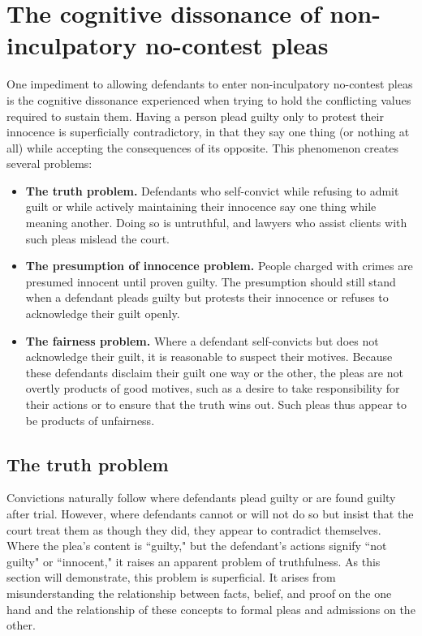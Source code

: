 \section{The cognitive dissonance of non-inculpatory no-contest pleas}

One impediment to allowing defendants to enter non-inculpatory no-contest pleas is the cognitive dissonance experienced when trying to hold the conflicting values required to sustain them. Having a person plead guilty only to protest their innocence is superficially contradictory, in that they say one thing (or nothing at all) while accepting the consequences of its opposite. This phenomenon creates several problems:

\begin{itemize}
    \item \textbf{The truth problem.} Defendants who self-convict while refusing to admit guilt or while actively maintaining their innocence say one thing while meaning another. Doing so is untruthful, and lawyers who assist clients with such pleas mislead the court. 
    \item \textbf{The presumption of innocence problem.} People charged with crimes are presumed innocent until proven guilty. The presumption should still stand when a defendant pleads guilty but protests their innocence or refuses to acknowledge their guilt openly.
    \item \textbf{The fairness problem.} Where a defendant self-convicts but does not acknowledge their guilt, it is reasonable to suspect their motives. Because these defendants disclaim their guilt one way or the other, the pleas are not overtly products of good motives, such as a desire to take responsibility for their actions or to ensure that the truth wins out. Such pleas thus appear to be products of unfairness. 
\end{itemize}

\subsection{The truth problem}

Convictions naturally follow where defendants plead guilty or are found guilty after trial. However, where defendants cannot or will not do so but insist that the court treat them as though they did, they appear to contradict themselves. Where the plea's content is ``guilty," but the defendant's actions signify ``not guilty" or ``innocent," it raises an apparent problem of truthfulness. As this section will demonstrate, this problem is superficial. It arises from misunderstanding the relationship between facts, belief, and proof on the one hand and the relationship of these concepts to formal pleas and admissions on the other.

